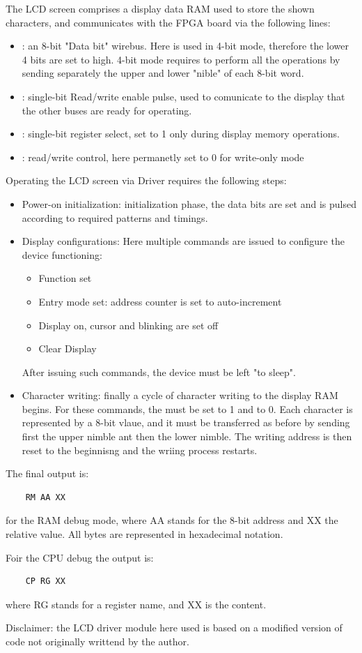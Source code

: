 The LCD screen comprises a display data RAM used to store the shown characters,
and communicates with the FPGA board via the following lines:
\begin{itemize}
    \item {}: an 8-bit "Data bit" wirebus. Here is used in 4-bit mode, therefore the lower 4 bits are set to high. 
    4-bit mode requires to perform all the operations by sending separately the upper and lower "nible" of each 8-bit word.
    \item {}: single-bit Read/write enable pulse, used to comunicate to the display that the other buses are ready for operating.
    \item {}: single-bit register select, set to 1 only during display memory operations.
    \item {}: read/write control, here permanetly set to 0 for write-only mode
\end{itemize}
Operating the LCD screen via Driver requires the following steps:
\begin{itemize}
    \item Power-on initialization: initialization phase, the data bits are set and  is pulsed according to required patterns and timings.
    \item Display configurations: Here multiple commands are issued to configure the device functioning:
    \begin{itemize}
        \item Function set
        \item Entry mode set: address counter is set to auto-increment
        \item Display on, cursor and blinking are set off
        \item Clear Display
    \end{itemize}
    After issuing such commands, the device must be left "to sleep".
    \item Character writing: finally a cycle of character writing to the display RAM begins. For these commands, the  must be set
    to 1 and  to 0. Each character is represented by a 8-bit vlaue, and it must be transferred as before by sending first the upper nimble ant then the lower nimble.
    The writing address is then reset to the beginnisng and the wriing process restarts.
\end{itemize}
The final output is:

\begin{verbatim}
    RM AA XX
\end{verbatim}
for the RAM debug mode, where AA stands for the 8-bit address and XX the relative value.
All bytes are represented in hexadecimal notation.

Foir the CPU debug the output is:
\begin{verbatim}
    CP RG XX
\end{verbatim}
where RG stands for a register name, and XX is the content.

Disclaimer: the LCD driver module here used is based on a modified version of code not originally writtend by the author.